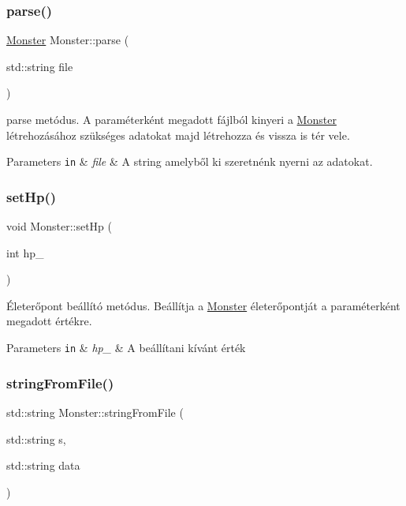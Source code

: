 \subsubsection{\texorpdfstring{parse()}{parse()}}
{\footnotesize\ttfamily \hyperlink{classMonster}{Monster} Monster\+::parse (\begin{DoxyParamCaption}\item[{std\+::string}]{file }\end{DoxyParamCaption})\hspace{0.3cm}{\ttfamily [static]}}



parse metódus. A paraméterként megadott fájlból kinyeri a \hyperlink{classMonster}{Monster} létrehozásához szükséges adatokat majd létrehozza és vissza is tér vele. 


\begin{DoxyParams}[1]{Parameters}
\mbox{\tt in}  & {\em file} & A string amelyből ki szeretnénk nyerni az adatokat. \\
\hline
\end{DoxyParams}
\mbox{\label{classMonster_a6d3e2bbbde9ffa2992323f4ed810a8ab}} 
\subsubsection{\texorpdfstring{set\+Hp()}{setHp()}}
{\footnotesize\ttfamily void Monster\+::set\+Hp (\begin{DoxyParamCaption}\item[{int}]{hp\+\_\+ }\end{DoxyParamCaption})}



Életerőpont beállító metódus. Beállítja a \hyperlink{classMonster}{Monster} életerőpontját a paraméterként megadott értékre. 


\begin{DoxyParams}[1]{Parameters}
\mbox{\tt in}  & {\em hp\+\_\+} & A beállítani kívánt érték \\
\hline
\end{DoxyParams}
\mbox{\label{classMonster_a3f4024974e75839d41066bbb41488d3b}} 
\subsubsection{\texorpdfstring{string\+From\+File()}{stringFromFile()}}
{\footnotesize\ttfamily std\+::string Monster\+::string\+From\+File (\begin{DoxyParamCaption}\item[{std\+::string}]{s,  }\item[{std\+::string}]{data }\end{DoxyParamCaption})\hspace{0.3cm}{\ttfamily [static]}}



